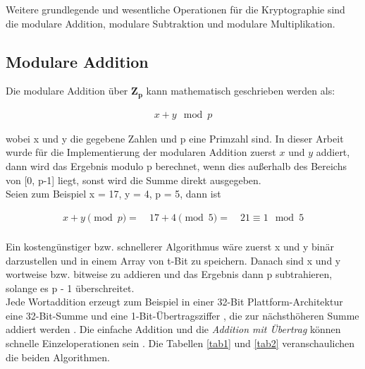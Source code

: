 Weitere grundlegende und wesentliche Operationen für die
Kryptographie sind die modulare Addition, modulare Subtraktion und modulare Multiplikation. 


\subsection{Modulare Addition}


Die modulare Addition über $ \mathbf{Z_p} $ kann mathematisch
geschrieben werden als:

\begin{ceqn}
\begin{align*}
    x + y \mod p 
\end{align*}
\end{ceqn} wobei x und y die
gegebene Zahlen und p eine Primzahl sind. In dieser Arbeit wurde für die Implementierung der modularen Addition zuerst $ x $ und $ y $ 
addiert, dann wird das Ergebnis modulo p berechnet, wenn dies außerhalb des Bereichs von [0, p-1] liegt, sonst wird die Summe direkt ausgegeben. \\

Seien zum Beispiel x = 17, y = 4, p = 5, dann ist
\begin{ceqn}

\begin{align*}
   x + y \pmod p = \quad 17 + 4 \pmod 5 = \quad 21 \equiv 1 \mod 5 \\
\end{align*}
\end{ceqn}
Ein kostengünstiger bzw. schnellerer Algorithmus wäre zuerst x und y binär darzustellen und in einem Array von t-Bit zu speichern.
Danach sind x und y wortweise bzw.
bitweise zu addieren und das Ergebnis dann p subtrahieren, solange es p - 1 überschreitet. \\

Jede Wortaddition erzeugt zum Beispiel in einer 32-Bit Plattform-Architektur eine 32-Bit-Summe und eine 1-Bit-Übertragsziffer , die zur
nächsthöheren Summe addiert werden \cite{nist}. Die einfache Addition und die \textit{Addition mit Übertrag} können schnelle Einzeloperationen sein \cite{Hossain2019}. Die Tabellen \ref{tab1} und \ref{tab2} veranschaulichen die beiden Algorithmen. 

